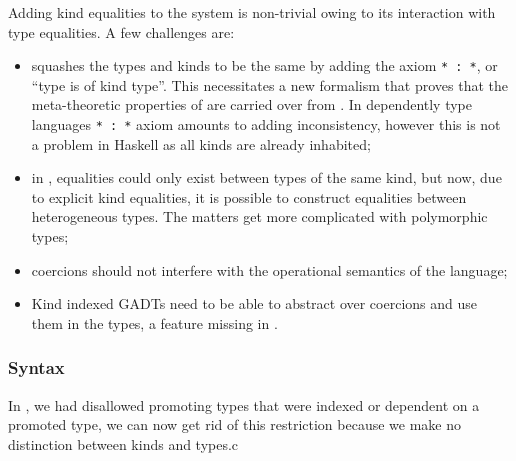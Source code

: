 \documentclass[screen,nonacm]{acmart}
\begin{document}
Adding kind equalities to the system is non-trivial owing to its interaction with type equalities. A few challenges are:
\begin{itemize}
 \item \SFK squashes the types and kinds to be the same by adding the axiom \lstinline{* : *}, or ``type is of kind type''. This necessitates a new formalism that proves that the meta-theoretic properties of \SFK are carried over from \SFC. In dependently type languages \lstinline{* : *} axiom amounts to adding inconsistency, however this is not a problem in Haskell as all kinds are already inhabited;
 \item in \SFC, equalities could only exist between types of the same kind, but now, due to explicit kind equalities, it is possible to construct equalities between heterogeneous types. The matters get more complicated with polymorphic types;
 \item coercions should not interfere with the operational semantics of the language;
 \item Kind indexed GADTs need to be able to abstract over coercions and use them in the types, a feature missing in \SFC.
\end{itemize}

\subsubsection{Syntax}\label{sec:sfk-syntax}
In \SFP, we had disallowed promoting types that were indexed or dependent on a promoted type, we can now get rid of this restriction because we make no distinction between kinds and types.c
\end{document}
